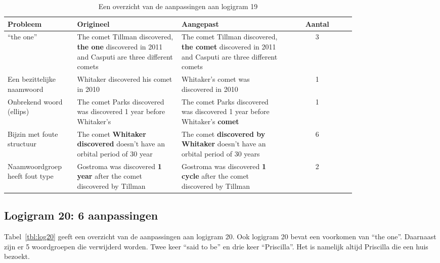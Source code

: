 \begin{table}[h]
  \centering
  \begin{tabular}{p{0.2\linewidth}p{0.3\linewidth}p{0.3\linewidth}c}
    \toprule
    \textbf{Probleem} & \textbf{Origineel} & \textbf{Aangepast} & \textbf{Aantal} \\ 
    \hline
    ``the one'' & The comet Tillman discovered, \textbf{the one} discovered in 2011 and Casputi are three different comets & The comet Tillman discovered, \textbf{the comet} discovered in 2011 and Casputi are three different comets & 3 \\
    \hline
    Een bezittelijke naamwoord & Whitaker discovered his comet in 2010 & Whitaker's comet was discovered in 2010 & 1 \\
    \hline
    Onbrekend woord (ellips) & The comet Parks discovered was discovered 1 year before Whitaker's & The comet Parks discovered was discovered 1 year before Whitaker's \textbf{comet} & 1 \\
    \hline
    Bijzin met foute structuur & The comet \textbf{Whitaker discovered} doesn't have an orbital period of 30 year & The comet \textbf{discovered by Whitaker} doesn't have an orbital period of 30 years & 6 \\
    \hline
    Naamwoordgroep heeft fout type & Gostroma was discovered \textbf{1 year} after the comet discovered by Tillman & Gostroma was discovered \textbf{1 cycle} after the comet discovered by Tillman & 2 \\
    \bottomrule
  \end{tabular}
  \caption{Een overzicht van de aanpassingen aan logigram 19}
  \label{tbl:log19}
\end{table}

\subsection{Logigram 20: 6 aanpassingen}
Tabel~\ref{tbl:log20} geeft een overzicht van de aanpassingen aan logigram 20. Ook logigram 20 bevat een voorkomen van ``the one''. Daarnaast zijn er 5 woordgroepen die verwijderd worden. Twee keer ``said to be'' en drie keer ``Priscilla''. Het is namelijk altijd Priscilla die een huis bezoekt.

